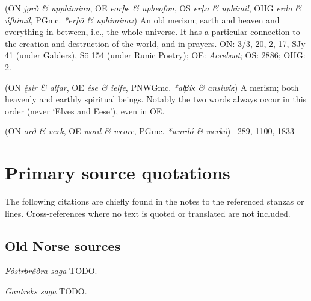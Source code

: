 \begin{itemize}
 (ON \emph{jǫrð \& upphiminn}, OE \emph{eorþe \& upheofon}, OS \emph{erþa \& uphimil}, OHG \emph{erdo \& úfhimil}, PGmc. \emph{*erþō \& uphiminaz})
  An old merism; earth and heaven and everything in between, i.e., the whole universe. It has a particular connection to the creation and destruction of the world, and in prayers.
  ON:  3/3,  20,  2,  17, SJy 41 (under Galders), Sö 154 (under Runic Poetry);
  OE: \emph{Acreboot};
  OS:  2886;
  OHG:  2.

 (ON \emph{ę́sir \& alfar}, OE \emph{ése \& ielfe}, PNWGmc. \emph{*alβíʀ \& ansiwiʀ})
  A merism; both heavenly and earthly spiritual beings.  Notably the two words always occur in this order (never ‘Elves and Eese’), even in OE.

 (ON \emph{orð \& verk}, OE \emph{word \& weorc}, PGmc. \emph{*wurdó \& werkó})
  \Beowulf\ 289, 1100, 1833

\newpage

\section{Primary source quotations}

The following citations are chiefly found in the notes to the referenced stanzas or lines. Cross-references where no text is quoted or translated are not included.

\subsection{Old Norse sources}

\emph{Fóstrbrǿðra saga} TODO.

\emph{Gautreks saga} TODO.


\end{itemize}
